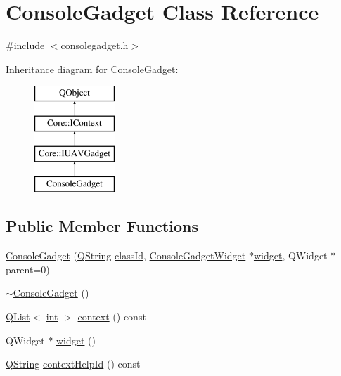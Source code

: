 \hypertarget{class_console_gadget}{\section{Console\-Gadget Class Reference}
\label{class_console_gadget}
}


{\ttfamily \#include $<$consolegadget.\-h$>$}

Inheritance diagram for Console\-Gadget\-:\begin{figure}[H]
\begin{center}
\leavevmode
\includegraphics[height=4.000000cm]{class_console_gadget}
\end{center}
\end{figure}
\subsection*{Public Member Functions}
\begin{DoxyCompactItemize}
\item 
\hyperlink{group___console_plugin_ga4c0ebb0d0d98dc2464d1a43c68feec60}{Console\-Gadget} (\hyperlink{group___u_a_v_objects_plugin_gab9d252f49c333c94a72f97ce3105a32d}{Q\-String} \hyperlink{group___core_plugin_ga3878fde66a57220608960bcc3fbeef2c}{class\-Id}, \hyperlink{class_console_gadget_widget}{Console\-Gadget\-Widget} $\ast$\hyperlink{group___console_plugin_gaa9fff820073d054b2ab58500206fe54d}{widget}, Q\-Widget $\ast$parent=0)
\item 
\hyperlink{group___console_plugin_ga8cfb9cc05b03bf8d1ff2fda3befc6326}{$\sim$\-Console\-Gadget} ()
\item 
\hyperlink{class_q_list}{Q\-List}$<$ \hyperlink{ioapi_8h_a787fa3cf048117ba7123753c1e74fcd6}{int} $>$ \hyperlink{group___console_plugin_ga0035ad50dabedbce0cb07ecd85ef95f0}{context} () const 
\item 
Q\-Widget $\ast$ \hyperlink{group___console_plugin_gaa9fff820073d054b2ab58500206fe54d}{widget} ()
\item 
\hyperlink{group___u_a_v_objects_plugin_gab9d252f49c333c94a72f97ce3105a32d}{Q\-String} \hyperlink{group___console_plugin_gad1700fcf695662402ed7faba6ca2a239}{context\-Help\-Id} () const 
\end{DoxyCompactItemize}
